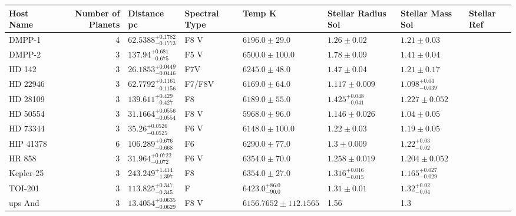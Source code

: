 \begin{tabular}{lrllllll}
\toprule
Host Name & Number of Planets & Distance pc & Spectral Type & Temp K & Stellar Radius Sol & Stellar Mass Sol & Stellar Ref \\
\midrule
DMPP-1 & 4 & $62.5388^{+0.1782}_{-0.1773}$ & F8 V & $6196.0 \pm 29.0$ & $1.26 \pm 0.02$ & $1.21 \pm 0.03$ & \cite{STAAB_ET_AL__2020} \\
DMPP-2 & 3 & $137.94^{+0.681}_{-0.675}$ & F5 V & $6500.0 \pm 100.0$ & $1.78 \pm 0.09$ & $1.41 \pm 0.04$ & \cite{HASWELL_ET_AL__2020} \\
HD 142 & 3 & $26.1853^{+0.0449}_{-0.0446}$ & F7V & $6245.0 \pm 48.0$ & $1.47 \pm 0.04$ & $1.21 \pm 0.17$ & \cite{WITTENMYER_ET_AL__2012} \\
HD 22946 & 3 & $62.7792^{+0.1161}_{-0.1156}$ & F7/F8V & $6169.0 \pm 64.0$ & $1.117 \pm 0.009$ & $1.098^{+0.04}_{-0.039}$ & \cite{GARAI_ET_AL__2023} \\
HD 28109 & 3 & $139.611^{+0.429}_{-0.427}$ & F8 & $6189.0 \pm 55.0$ & $1.425^{+0.048}_{-0.041}$ & $1.227 \pm 0.052$ & \cite{BARONE_ET_AL_2025} \\
HD 50554 & 3 & $31.1664^{+0.0556}_{-0.0554}$ & F8 V & $5968.0 \pm 96.0$ & $1.146 \pm 0.026$ & $1.04 \pm 0.05$ & \cite{LIU_ET_AL_2026} \\
HD 73344 & 3 & $35.26^{+0.0526}_{-0.0525}$ & F6 V & $6148.0 \pm 100.0$ & $1.22 \pm 0.03$ & $1.19 \pm 0.05$ & \cite{ZHANG_ET_AL_2025} \\
HIP 41378 & 6 & $106.289^{+0.676}_{-0.668}$ & F6 & $6290.0 \pm 77.0$ & $1.3 \pm 0.009$ & $1.22^{+0.03}_{-0.02}$ & \cite{LUND_ET_AL_2019} \\
HR 858 & 3 & $31.964^{+0.0722}_{-0.072}$ & F6 V & $6354.0 \pm 70.0$ & $1.258 \pm 0.019$ & $1.204 \pm 0.052$ & \cite{BONFANTI_ET_AL__2025} \\
Kepler-25 & 3 & $243.249^{+1.414}_{-1.397}$ & F8 & $6354.0 \pm 27.0$ & $1.316^{+0.016}_{-0.015}$ & $1.165^{+0.027}_{-0.029}$ & \cite{BOURRIER_ET_AL__2023} \\
TOI-201 & 3 & $113.825^{+0.347}_{-0.345}$ & F & $6423.0^{+86.0}_{-90.0}$ & $1.31 \pm 0.01$ & $1.32^{+0.02}_{-0.04}$ & \cite{MIRELES_ET_AL_2026} \\
ups And & 3 & $13.4054^{+0.0635}_{-0.0629}$ & F8 V & $6156.7652 \pm 112.1565$ & 1.56 & 1.3 & \cite{ROSENTHAL_ET_AL__2021} \\
\bottomrule
\end{tabular}
